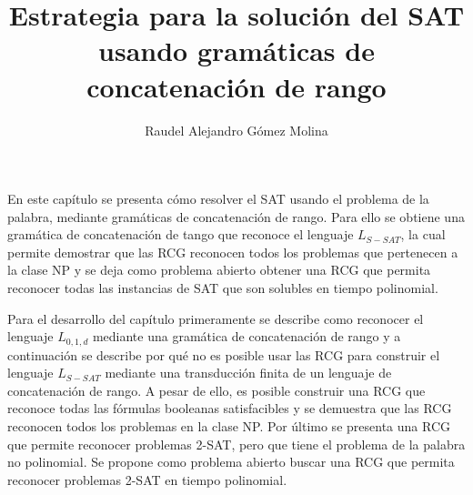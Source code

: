 \documentclass[12pt]{article}
\title{Estrategia para la solución del SAT usando gramáticas de concatenación de rango}
\author{Raudel Alejandro Gómez Molina}
\begin{document}
\maketitle





En este capítulo se presenta cómo resolver el SAT usando el problema de la palabra, mediante gramáticas de 
concatenación de rango. Para ello se obtiene una gramática de concatenación de tango que reconoce el lenguaje $L_{S-SAT}$, la cual permite demostrar que las RCG reconocen todos los problemas que pertenecen a la clase NP y se deja como problema abierto obtener una RCG que permita reconocer todas las instancias de SAT que son solubles en tiempo polinomial.

Para el desarrollo del capítulo primeramente se describe como reconocer el lenguaje $L_{0,1,d}$ mediante una gramática de concatenación de rango y a continuación se describe por qué no es posible usar las RCG para construir el lenguaje $L_{S-SAT}$ mediante una transducción finita de un lenguaje de concatenación de rango. A pesar de ello, es posible construir una RCG que reconoce todas las fórmulas booleanas satisfacibles y se demuestra que las RCG reconocen todos los problemas en la clase NP. Por último se presenta una RCG que permite reconocer problemas 2-SAT, pero que tiene el problema de la palabra no polinomial. Se propone como problema abierto buscar una RCG que permita reconocer problemas 2-SAT en tiempo polinomial.
\end{document}
